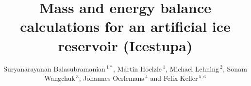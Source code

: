 \documentclass[utf8]{frontiersSCNS} %
\def\keyFont{\fontsize{8}{11}\helveticabold }
\def\firstAuthorLast{Balasubramanian {et~al.}} %
\def\Authors{Suryanarayanan Balasubramanian\,$^{1*}$, Martin Hoelzle\,$^{1}$, Michael Lehning\,$^{2}$, Sonam Wangchuk\,$^{3}$, Johannes Oerlemans\,$^{4}$ and Felix Keller\,$^{5,6}$}
\begin{document}
\onecolumn
{}

\title[Artificial Ice Reservoirs]{Mass and energy balance calculations for an artificial ice reservoir (Icestupa)}

\author[\firstAuthorLast ]{\Authors}
\address{}
\correspondance{}

\extraAuth{}



% 
% 
\end{document}
